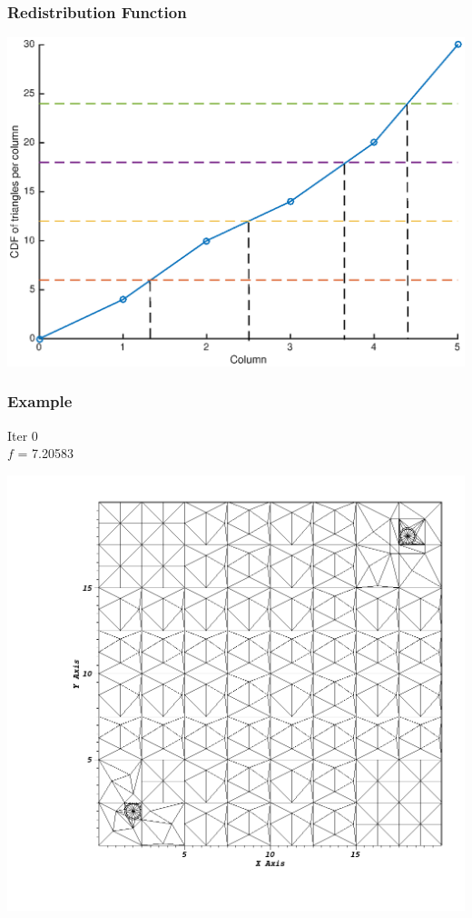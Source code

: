 \documentclass[]{beamer}
\begin{document}
\begin{frame}[t]\frametitle{Redistribution Function}
\centering
\includegraphics[scale = 0.5]{figures/after_redistribute.eps}
\end{frame}

\begin{frame}[t]\frametitle{Example}
\begin{minipage}{0.15\textwidth}
\begin{footnotesize}
Iter 0 \\
$f$ = 7.20583 
\end{footnotesize}
\end{minipage}
\begin{minipage}{0.8\textwidth}
\centering
\includegraphics[scale = 0.22]{figures/redistribute_before.png}
\end{minipage}
\end{frame}
\end{document}
